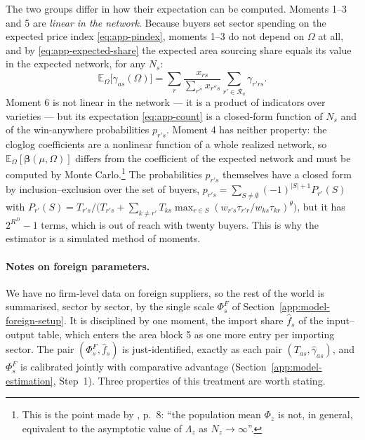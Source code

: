 The two groups differ in how their expectation can be computed. Moments 1--3 and 5 are \emph{linear in the network}. Because buyers set sector spending on the expected price index \eqref{eq:app-pindex}, moments 1--3 do not depend on $\Omega$ at all, and by \eqref{eq:app-expected-share} the expected area sourcing share equals its value in the expected network, for any $N_s$:
\begin{equation}
\mathbb{E}_\Omega\big[\gamma_{as}(\Omega)\big]=\sum_r \frac{x_{rs}}{\sum_{r''}x_{r''s}}\sum_{r'\in\mathcal{R}_a}\gamma_{r'rs}.
\label{eq:app-gamma-linear}
\end{equation}
Moment 6 is not linear in the network --- it is a product of indicators over varieties --- but its expectation \eqref{eq:app-count} is a closed-form function of $N_s$ and of the win-anywhere probabilities $p_{r's}$. Moment 4 has neither property: the cloglog coefficients are a nonlinear function of a whole realized network, so $\mathbb{E}_\Omega[\boldsymbol\beta(\mu,\Omega)]$ differs from the coefficient of the expected network and must be computed by Monte Carlo.\footnote{This is the point made by \cite{gaubertitskhohi2021}, p.~8: ``the population mean $\Phi_z$ is not, in general, equivalent to the asymptotic value of $\Lambda_z$ as $N_z\to\infty$''.} The probabilities $p_{r's}$ themselves have a closed form by inclusion--exclusion over the set of buyers, $p_{r's}=\sum_{S\neq\emptyset}(-1)^{|S|+1}P_{r'}(S)$ with $P_{r'}(S)=T_{r's}/\big(T_{r's}+\sum_{k\neq r'}T_{ks}\max_{r\in S}(w_{r's}\tau_{r'r}/w_{ks}\tau_{kr})^{\theta}\big)$, but it has $2^{R^D}-1$ terms, which is out of reach with twenty buyers. This is why the estimator is a simulated method of moments.

\paragraph{Notes on foreign parameters.}
\label{app:model-foreign}
We have no firm-level data on foreign suppliers, so the rest of the world is summarised, sector by sector, by the single scale $\Phi^F_s$ of Section~\ref{app:model-foreign-setup}. It is disciplined by one moment, the import share $\hat f_s$ of the input--output table, which enters the area block 5 as one more entry per importing sector. The pair $(\Phi^F_s,\hat f_s)$ is just-identified, exactly as each pair $(T_{as},\hat\gamma_{as})$, and $\Phi^F_s$ is calibrated jointly with comparative advantage (Section~\ref{app:model-estimation}, Step~1). Three properties of this treatment are worth stating.

